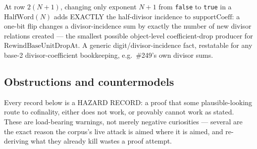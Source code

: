\begin{prop}
At row $2(N{+}1)$, changing only exponent $N{+}1$ from \texttt{false} to \texttt{true} in a
$\mathrm{HalfWord}(N)$ adds EXACTLY the half-divisor incidence to $\mathrm{supportCoeff}$: a
one-bit flip changes a divisor-incidence sum by exactly the number of new divisor relations
created — the smallest possible object-level coefficient-drop producer for
$\mathrm{RewindBaseUnitDropAt}$. A generic digit/divisor-incidence fact, restatable for any
base-2 divisor-coefficient bookkeeping, e.g.\ \#249's own divisor sums.
\par\noindent{}    
\end{prop}

\subsection{Obstructions and countermodels}

Every record below is a HAZARD RECORD: a proof that some plausible-looking route to
cofinality, either does not work, or provably cannot work as stated. These are load-bearing
warnings, not merely negative curiosities — several are the exact reason the corpus's live
attack is aimed where it is aimed, and re-deriving what they already kill wastes a proof
attempt.

